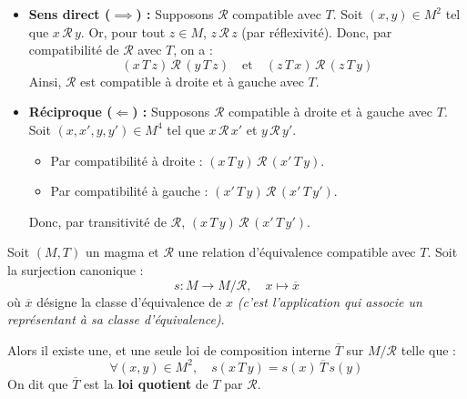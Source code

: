 \documentclass[a4paper,11pt]{article}
\newcommand{\mot}[1]{\textcolor{bordeaux}{\textbf{#1}}}
\begin{document}
\begin{demonstration}
\begin{itemize}
    \item \textbf{Sens direct ($\implies$) :} Supposons $\mathcal{R}$ compatible avec $T$.
    Soit $(x, y) \in M^2$ tel que $x \, \mathcal{R} \, y$. Or, pour tout $z \in M$, $z \, \mathcal{R} \, z$ (par réflexivité).
    Donc, par compatibilité de $\mathcal{R}$ avec $T$, on a :
    \[
    (x \, T \, z) \, \mathcal{R} \, (y \, T \, z) \quad \text{et} \quad (z \, T \, x) \, \mathcal{R} \, (z \, T \, y)
    \]
    Ainsi, $\mathcal{R}$ est compatible à droite et à gauche avec $T$.

    \item \textbf{Réciproque ($\Longleftarrow$) :} Supposons $\mathcal{R}$ compatible à droite et à gauche avec $T$.
    Soit $(x, x', y, y') \in M^4$ tel que $x \, \mathcal{R} \, x'$ et $y \, \mathcal{R} \, y'$.
    \begin{itemize}
        \item Par compatibilité à droite : $(x \, T \, y) \, \mathcal{R} \, (x' \, T \, y)$.
        \item Par compatibilité à gauche : $(x' \, T \, y) \, \mathcal{R} \, (x' \, T \, y')$.
    \end{itemize}
    Donc, par transitivité de $\mathcal{R}$, $(x \, T \, y) \, \mathcal{R} \, (x' \, T \, y')$.
\end{itemize}
\end{demonstration}

\begin{theoreme}[et Définition]
Soit $(M, T)$ un magma et $\mathcal{R}$ une relation d'équivalence compatible avec $T$.
Soit la surjection canonique :
\[
s : M \longrightarrow M / \mathcal{R}, \quad x \longmapsto \overline{x}
\]
où $\overline{x}$ désigne la classe d'équivalence de $x$ \textit{(c'est l'application qui associe un représentant à sa classe d'équivalence)}.

Alors il existe une, et une seule loi de composition interne $\overline{T}$ sur $M / \mathcal{R}$ telle que :
\[
\forall (x, y) \in M^2, \quad s(x \, T \, y) = s(x) \, \overline{T} \, s(y)
\]
On dit que $\overline{T}$ est la \mot{loi quotient} de $T$ par $\mathcal{R}$.
\end{theoreme}
\end{document}
